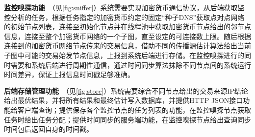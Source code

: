 \documentclass[supercite]{HustGraduPaper}
\newcommand{\rfig}[1]{\autoref{fig:#1}}
\theoremstyle{definition}
\begin{document}
\textbf{监控嗅探功能}\ （见\rfig{sniffer}）系统需要实现加密货币通信协议，从后端获取监控分析的任务，根据任务指定的加密货币约定的固定“种子DNS”获取点对点网络的初始节点列表，连接至初始化节点并在线程池中获取加密货币节点给出的邻节点信息，连接至整个加密货币网络的一个子图，直至设定的可连接数上限。随后根据连接到的加密货币网络节点传来的交易信息，借助不同的传播源估计算法给出当前子图中可能的交易始发节点信息，上报到系统后端进行存储。在监控嗅探进行的同时需要和系统后端进行周期性通信，通过时间同步算法抹除不同节点间的系统运行时间差异，保证上报信息时间戳足够准确。

\textbf{后端存储管理功能}\ （见\rfig{store}）系统需要综合不同节点给出的交易来源IP结论给出最优结果，并将所有结果和最终估计写入数据库，并提供HTTP JSON接口功能给客户端查询；提供保存各个监控节点的任务列表的功能，在监控嗅探节点获取任务时给出任务分配；提供时间同步的服务端功能，在监控嗅探节点给出查询同步时间包后返回自身的时间戳。
\end{document}
